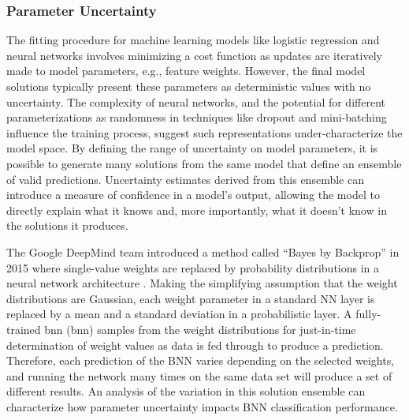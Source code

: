 
\subsubsection{Parameter Uncertainty}

The fitting procedure for machine learning models like logistic regression and neural networks involves minimizing a cost function as updates are iteratively made to model parameters, e.g., feature weights. However, the final model solutions typically present these parameters as deterministic values with no uncertainty. The complexity of neural networks, and the potential for different parameterizations as randomness in techniques like dropout and mini-batching influence the training process, suggest such representations under-characterize the model space. By defining the range of uncertainty on model parameters, it is possible to generate many solutions from the same model that define an ensemble of valid predictions. Uncertainty estimates derived from this ensemble can introduce a measure of confidence in a model’s output, allowing the model to directly explain what it knows and, more importantly, what it doesn’t know in the solutions it produces.

The Google DeepMind team introduced a method called “Bayes by Backprop” in 2015 where single-value weights are replaced by probability distributions in a neural network architecture \citep{blundell_weight_2015}. Making the simplifying assumption that the weight distributions are Gaussian, each weight parameter in a standard NN layer is replaced by a mean and a standard deviation in a probabilistic layer. A fully-trained \acrlong{bnn} (\acrshort{bnn}) samples from the weight distributions for just-in-time determination of weight values as data is fed through to produce a prediction. Therefore, each prediction of the BNN varies depending on the selected weights, and running the network many times on the same data set will produce a set of different results. An analysis of the variation in this solution ensemble can characterize how parameter uncertainty impacts BNN classification performance.

